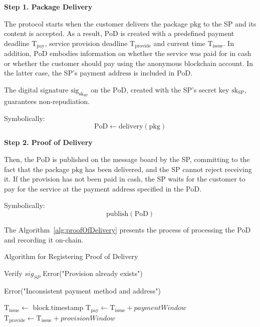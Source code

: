 \documentclass[pdftex,twocolumn,epjc3]{svjour3}
\begin{document}
{\noindent \textbf
{Step 1. Package Delivery}\label{step-1-package-delivery}

The protocol starts when the customer delivers the package $\mathrm{pkg}$ to the SP and its content is accepted. As a result, $\mathrm{PoD}$ is created with a predefined payment deadline $\mathrm{T}_\mathrm{pay}$, service provision deadline $\mathrm{T}_\mathrm{provide}$ and current time $\mathrm{T}_\mathrm{issue}$. In addition, $\mathrm{PoD}$ embodies information on whether the service was paid for in cash or whether the customer should pay using the anonymous blockchain account. In the latter case, the SP's payment $\mathrm{address}$ is included in $\mathrm{PoD}$.

The digital signature $\mathrm{sig}_{\mathrm{sk}_\mathrm{SP}}$ on the $\mathrm{PoD}$, created with the SP's secret key $\mathrm{sk}_\mathrm{SP}$, guarantees non-repudiation.

Symbolically: 
\[
\mathrm{PoD \gets delivery(pkg)}
\]

\noindent \textbf
{Step 2. Proof of Delivery}\label{step-2-pod}

Then, the $\mathrm{PoD}$ is published on the message board by the SP, committing to the fact that the package $\mathrm{pkg}$ has been delivered, and the SP cannot reject receiving it. If the provision has not been paid in cash, the SP waits for the customer to pay for the service at the payment $\mathrm{address}$ specified in the $\mathrm{PoD}$.

Symbolically: 
\[
\mathrm{publish(PoD)}
\]

The Algorithm~\ref{alg:proofOfDelivery} presents the process of processing the PoD and recording it on-chain.

\begin{algorithm}
\caption{Algorithm for Registering Proof of Delivery}
\label{alg:proofOfDelivery}
\begin{algorithmic}[1]
    \State Verify $sig_{SP}$
        \State \Return Error("Provision already exists")
    \EndIf

        \State \Return Error("Inconsistent payment method and address")
    \EndIf
    
    \State $\mathrm{T}_\mathrm{issue} \gets$ block.timestamp
    \State $\mathrm{T}_\mathrm{pay} \gets \mathrm{T}_\mathrm{issue} + paymentWindow$
    \State $\mathrm{T}_\mathrm{provide} \gets \mathrm{T}_\mathrm{issue} + provisionWindow$


\end{algorithmic}
\end{algorithm}}
\end{document}
